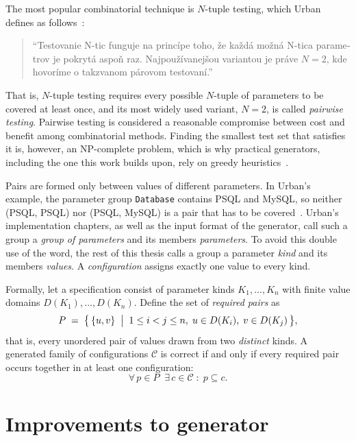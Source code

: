 \documentclass[
  digital, %
  oneside, %
  lof,     %
  nolot,     %
]{fithesis4}
\begin{document}
The most popular combinatorial technique is $N$-tuple testing, which Urban
defines as follows~\cite[pp.~18--19]{Urban2024thesis}:
%
\begin{quote}
  \foreignlanguage{slovak}{\enquote{Testovanie N-tic funguje na princípe toho,
  že každá možná N-tica parametrov je pokrytá aspoň raz. Najpoužívanejšou
  variantou je práve $N = 2$, kde hovoríme o takzvanom párovom testovaní.}}
\end{quote}
%
That is, $N$-tuple testing requires every possible $N$-tuple of parameters to be
covered at least once, and its most widely used variant, $N = 2$, is called
\emph{pairwise testing}. Pairwise testing is considered a reasonable compromise
between cost and benefit among combinatorial methods. Finding the smallest test
set that satisfies it is, however, an NP-complete problem, which is why practical
generators, including the one this work builds upon, rely on greedy
heuristics~\cite[p.~19]{Urban2024thesis}.

Pairs are formed only between values of different parameters. In Urban's
example, the parameter group \texttt{Database} contains PSQL and MySQL, so
neither (PSQL, PSQL) nor (PSQL, MySQL) is a pair that has to be
covered~\cite[p.~19]{Urban2024thesis}. Urban's implementation chapters, as well
as the input format of the generator, call such a group a \emph{group of
parameters} and its members \emph{parameters}. To avoid this double use of the
word, the rest of this thesis calls a group a parameter \emph{kind} and its
members \emph{values}. A \emph{configuration} assigns exactly one value to every
kind.

Formally, let a specification consist of parameter kinds $K_1,\dots,K_n$ with finite
value domains $D(K_1),\dots,D(K_n)$. Define the set of \emph{required pairs} as
%
\begin{equation}
  \label{eq:required-pairs}
  P \;=\; \bigl\{\, \{u,v\} \;\bigm|\;
      1 \le i < j \le n,\;
      u \in D(K_i),\;
      v \in D(K_j) \,\bigr\},
\end{equation}
%
that is, every unordered pair of values drawn from two \emph{distinct} kinds. A
generated family of configurations $\mathcal{C}$ is correct if and only if every
required pair occurs together in at least one configuration:
%
\begin{equation}
  \label{eq:coverage}
  \forall\, p \in P \;\;
  \exists\, c \in \mathcal{C} \;:\; p \subseteq c .
\end{equation}

\chapter{Improvements to generator}
\end{document}
